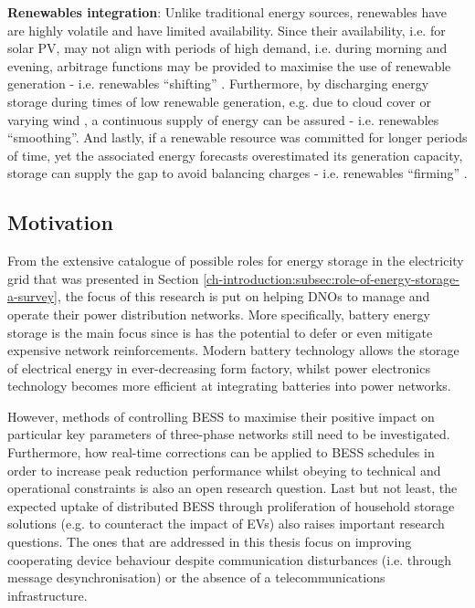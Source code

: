 \textbf{Renewables integration}: Unlike traditional energy sources, renewables have are highly volatile and have limited availability.
Since their availability, i.e. for solar PV, may not align with periods of high demand, i.e. during morning and evening, arbitrage functions may be provided to maximise the use of renewable generation - i.e. renewables ``shifting'' \cite{Zakeri2015}.
Furthermore, by discharging energy storage during times of low renewable generation, e.g. due to cloud cover or varying wind \cite{Jewell1987}, a continuous supply of energy can be assured - i.e. renewables ``smoothing''.
And lastly, if a renewable resource was committed for longer periods of time, yet the associated energy forecasts overestimated its generation capacity, storage can supply the gap to avoid balancing charges - i.e. renewables ``firming'' \cite{Chakraborty2012}.

\subsection{Motivation}
\label{ch-introduction:subsec:motivation}

From the extensive catalogue of possible roles for energy storage in the electricity grid that was presented in Section \ref{ch-introduction:subsec:role-of-energy-storage-a-survey}, the focus of this research is put on helping DNOs to manage and operate their power distribution networks.
More specifically, battery energy storage is the main focus since is has the potential to defer or even mitigate expensive network reinforcements.
Modern battery technology allows the storage of electrical energy in ever-decreasing form factory, whilst power electronics technology becomes more efficient at integrating batteries into power networks.

However, methods of controlling BESS to maximise their positive impact on particular key parameters of three-phase networks still need to be investigated.
Furthermore, how real-time corrections can be applied to BESS schedules in order to increase peak reduction performance whilst obeying to technical and operational constraints is also an open research question.
Last but not least, the expected uptake of distributed BESS through proliferation of household storage solutions (e.g. to counteract the impact of EVs) also raises important research questions.
The ones that are addressed in this thesis focus on improving cooperating device behaviour despite communication disturbances (i.e. through message desynchronisation) or the absence of a telecommunications infrastructure.





